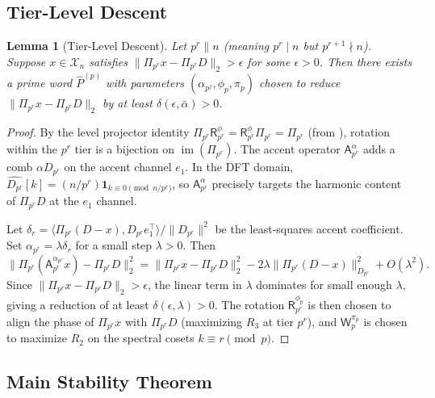 \documentclass[11pt]{amsart}
\newtheorem{lemma}[theorem]{Lemma}
\newcommand{\X}{\mathcal{X}}
\newcommand{\Prj}{\Pi}
\newcommand{\Ap}{\mathsf{A}}
\newcommand{\Rp}{\mathsf{R}}
\newcommand{\Wp}{\mathsf{W}}
\newcommand{\im}{\operatorname{im}}
\newcommand{\norm}[1]{\lVert #1 \rVert}
\begin{document}
\subsection{Tier-Level Descent}

\begin{lemma}[Tier-Level Descent]\label{lem:tier-descent}
Let $p^r \| n$ (meaning $p^r \mid n$ but $p^{r+1} \nmid n$). Suppose $x \in \X_n$ satisfies $\norm{\Prj_{p^r} x - \Prj_{p^r} D}_2 > \epsilon$ for some $\epsilon > 0$. Then there exists a prime word $\hat{P}^{(p)}$ with parameters $(\alpha_{p^j}, \phi_p, \pi_p)$ chosen to reduce $\norm{\Prj_{p^r} x - \Prj_{p^r} D}_2$ by at least $\delta(\epsilon, \bar\alpha) > 0$.
\end{lemma}

\begin{proof}
By the level projector identity $\Prj_{p^r} \Rp^{\phi}_{p^r} = \Rp^{\phi}_{p^r} \Prj_{p^r} = \Prj_{p^r}$ (from \cite[Appendix A]{MOC2026}), rotation within the $p^r$ tier is a bijection on $\im(\Prj_{p^r})$. The accent operator $\Ap^{\alpha}_{p^r}$ adds a comb $\alpha D_{p^r}$ on the accent channel $e_1$. In the DFT domain, $\widehat{D_{p^r}}[k] = (n/p^r)\mathbf{1}_{k \equiv 0 \pmod{n/p^r}}$, so $\Ap^{\alpha}_{p^r}$ precisely targets the harmonic content of $\Prj_{p^r} D$ at the $e_1$ channel.

Let $\delta_r = \langle \Prj_{p^r}(D - x), D_{p^r} e_1^\top \rangle / \norm{D_{p^r}}^2$ be the least-squares accent coefficient. Set $\alpha_{p^r} = \lambda \delta_r$ for a small step $\lambda > 0$. Then
\[
  \norm{\Prj_{p^r}(\Ap^{\alpha_{p^r}}_{p^r} x) - \Prj_{p^r} D}_2^2
  = \norm{\Prj_{p^r} x - \Prj_{p^r} D}_2^2 - 2\lambda \norm{\Prj_{p^r}(D-x)}_{D_{p^r}}^2 + O(\lambda^2).
\]
Since $\norm{\Prj_{p^r} x - \Prj_{p^r} D}_2 > \epsilon$, the linear term in $\lambda$ dominates for small enough $\lambda$, giving a reduction of at least $\delta(\epsilon, \lambda) > 0$. The rotation $\Rp^{\phi_p}_{p^r}$ is then chosen to align the phase of $\Prj_{p^r} x$ with $\Prj_{p^r} D$ (maximizing $R_3$ at tier $p^r$), and $\Wp^{\pi_p}_p$ is chosen to maximize $R_2$ on the spectral cosets $k \equiv r \pmod{p}$.
\end{proof}

\subsection{Main Stability Theorem}
\end{document}
